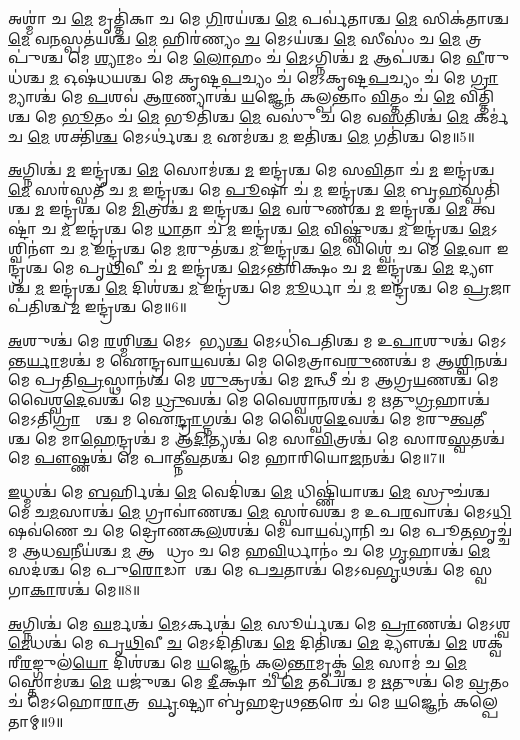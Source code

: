 𑌅𑌶𑍍𑌮𑌾॑ 𑌚 \ul{𑌮𑍇} 𑌮𑍃𑌤𑍍𑌤𑌿॑𑌕𑌾 𑌚 𑌮𑍇 \ul{𑌗𑌿}𑌰𑌯॑𑌶𑍍𑌚 \ul{𑌮𑍇} 𑌪𑌰𑍍𑌵॑𑌤𑌾𑌶𑍍𑌚 \ul{𑌮𑍇} 𑌸𑌿𑌕॑𑌤𑌾𑌶𑍍𑌚 \ul{𑌮𑍇} 𑌵\ul{𑌨}𑌸𑍍𑌪𑌤॑𑌯𑌶𑍍𑌚 \ul{𑌮𑍇} 𑌹𑌿𑌰॑𑌣𑍍𑌯𑌂 \ul{𑌚} 𑌮𑍇𑌽𑌯॑𑌶𑍍𑌚 \ul{𑌮𑍇} 𑌸𑍀𑌸𑌂॑ 𑌚 \ul{𑌮𑍇} 𑌤𑍍𑌰𑌪𑍁॑𑌶𑍍𑌚 𑌮𑍇 \ul{𑌶𑍍𑌯𑌾}𑌮𑌂 𑌚॑ 𑌮𑍇 \ul{𑌲𑍋}𑌹𑌂 𑌚॑ \ul{𑌮𑍇}𑌽𑌗𑍍𑌨𑌿𑌶𑍍𑌚॑ \ul{𑌮} 𑌆𑌪॑𑌶𑍍𑌚 𑌮𑍇 \ul{𑌵𑍀}𑌰𑍁𑌧॑𑌶𑍍𑌚 \ul{𑌮} 𑌓𑌷॑𑌧𑌯𑌶𑍍𑌚 𑌮𑍇 𑌕𑍃𑌷𑍍𑌟\ul{𑌪}𑌚𑍍𑌯𑌂 𑌚॑ 𑌮𑍇𑌽𑌕𑍃𑌷𑍍𑌟\ul{𑌪}𑌚𑍍𑌯𑌂 𑌚॑ 𑌮𑍇 \ul{𑌗𑍍𑌰𑌾}𑌮𑍍𑌯𑌾𑌶𑍍𑌚॑ 𑌮𑍇 \ul{𑌪}𑌶𑌵॑ 𑌆\ul{𑌰}𑌣𑍍𑌯𑌾𑌶𑍍𑌚॑ \ul{𑌯}𑌜𑍍𑌞𑍇𑌨॑ 𑌕𑌲𑍍𑌪𑌨𑍍𑌤𑌾𑌂 \ul{𑌵𑌿}𑌤𑍍𑌤𑌂 𑌚॑ \ul{𑌮𑍇} 𑌵𑌿𑌤𑍍𑌤𑌿॑𑌶𑍍𑌚 𑌮𑍇 \ul{𑌭𑍂}𑌤𑌂 𑌚॑ \ul{𑌮𑍇} 𑌭𑍂𑌤𑌿॑𑌶𑍍𑌚 \ul{𑌮𑍇} 𑌵𑌸𑍁॑ 𑌚 𑌮𑍇 𑌵\ul{𑌸}𑌤𑌿𑌶𑍍𑌚॑ \ul{𑌮𑍇} 𑌕𑌰𑍍𑌮॑ 𑌚 \ul{𑌮𑍇} 𑌶𑌕𑍍𑌤𑌿॑\ul{𑌶𑍍𑌚} 𑌮𑍇𑌽𑌰𑍍𑌥॑𑌶𑍍𑌚 \ul{𑌮} 𑌏𑌮॑𑌶𑍍𑌚 \ul{𑌮} 𑌇𑌤𑌿॑𑌶𑍍𑌚 \ul{𑌮𑍇} 𑌗𑌤𑌿॑𑌶𑍍𑌚 𑌮𑍇॥5॥ 

\ul{𑌅}𑌗𑍍𑌨𑌿𑌶𑍍𑌚॑ \ul{𑌮} 𑌇𑌨𑍍𑌦𑍍𑌰॑𑌶𑍍𑌚 \ul{𑌮𑍇} 𑌸𑍋𑌮॑𑌶𑍍𑌚 \ul{𑌮} 𑌇𑌨𑍍𑌦𑍍𑌰॑𑌶𑍍𑌚 𑌮𑍇 𑌸\ul{𑌵𑌿}𑌤𑌾 𑌚॑ \ul{𑌮} 𑌇𑌨𑍍𑌦𑍍𑌰॑𑌶𑍍𑌚 \ul{𑌮𑍇} 𑌸𑌰॑𑌸𑍍𑌵𑌤𑍀 𑌚 \ul{𑌮} 𑌇𑌨𑍍𑌦𑍍𑌰॑𑌶𑍍𑌚 𑌮𑍇 \ul{𑌪𑍂}𑌷𑌾 𑌚॑ \ul{𑌮} 𑌇𑌨𑍍𑌦𑍍𑌰॑𑌶𑍍𑌚 \ul{𑌮𑍇} 𑌬𑍃\ul{𑌹}𑌸𑍍𑌪𑌤𑌿॑𑌶𑍍𑌚 \ul{𑌮} 𑌇𑌨𑍍𑌦𑍍𑌰॑𑌶𑍍𑌚 𑌮𑍇 \ul{𑌮𑌿}𑌤𑍍𑌰𑌶𑍍𑌚॑ \ul{𑌮} 𑌇𑌨𑍍𑌦𑍍𑌰॑𑌶𑍍𑌚 \ul{𑌮𑍇} 𑌵𑌰𑍁॑𑌣𑌶𑍍𑌚 \ul{𑌮} 𑌇𑌨𑍍𑌦𑍍𑌰॑𑌶𑍍𑌚 \ul{𑌮𑍇} 𑌤𑍍𑌵𑌷𑍍𑌟𑌾॑ 𑌚 \ul{𑌮} 𑌇𑌨𑍍𑌦𑍍𑌰॑𑌶𑍍𑌚 𑌮𑍇 \ul{𑌧𑌾}𑌤𑌾 𑌚॑ \ul{𑌮} 𑌇𑌨𑍍𑌦𑍍𑌰॑𑌶𑍍𑌚 \ul{𑌮𑍇} 𑌵𑌿𑌷𑍍𑌣𑍁॑𑌶𑍍𑌚 \ul{𑌮} 𑌇𑌨𑍍𑌦𑍍𑌰॑𑌶𑍍𑌚 \ul{𑌮𑍇}𑌽𑌶𑍍𑌵𑌿𑌨𑍗॑ 𑌚 \ul{𑌮} 𑌇𑌨𑍍𑌦𑍍𑌰॑𑌶𑍍𑌚 𑌮𑍇 \ul{𑌮}𑌰𑍁𑌤॑𑌶𑍍𑌚 \ul{𑌮} 𑌇𑌨𑍍𑌦𑍍𑌰॑𑌶𑍍𑌚 \ul{𑌮𑍇} 𑌵𑌿𑌶𑍍𑌵𑍇॑ 𑌚 𑌮𑍇 \ul{𑌦𑍇}𑌵𑌾 𑌇𑌨𑍍𑌦𑍍𑌰॑𑌶𑍍𑌚 𑌮𑍇 𑌪𑍃\ul{𑌥𑌿}𑌵𑍀 𑌚॑ \ul{𑌮} 𑌇𑌨𑍍𑌦𑍍𑌰॑𑌶𑍍𑌚 \ul{𑌮𑍇}𑌽𑌨𑍍𑌤𑌰𑌿॑𑌕𑍍𑌷𑌂 𑌚 \ul{𑌮} 𑌇𑌨𑍍𑌦𑍍𑌰॑𑌶𑍍𑌚 \ul{𑌮𑍇} 𑌦𑍍𑌯𑍗𑌶𑍍𑌚॑ \ul{𑌮} 𑌇𑌨𑍍𑌦𑍍𑌰॑𑌶𑍍𑌚 \ul{𑌮𑍇} 𑌦𑌿𑌶॑𑌶𑍍𑌚 \ul{𑌮} 𑌇𑌨𑍍𑌦𑍍𑌰॑𑌶𑍍𑌚 𑌮𑍇 \ul{𑌮𑍂}𑌰𑍍𑌧𑌾 𑌚॑ \ul{𑌮} 𑌇𑌨𑍍𑌦𑍍𑌰॑𑌶𑍍𑌚 𑌮𑍇 \ul{𑌪𑍍𑌰}𑌜𑌾𑌪॑𑌤𑌿𑌶𑍍𑌚 \ul{𑌮} 𑌇𑌨𑍍𑌦𑍍𑌰॑𑌶𑍍𑌚 𑌮𑍇॥6॥ 

\ul{𑌅}\ul{}𑌶𑍁𑌶𑍍𑌚॑ 𑌮𑍇 \ul{𑌰}𑌶𑍍𑌮𑌿\ul{𑌶𑍍𑌚} 𑌮𑍇𑌽𑌦𑌾᳚𑌭𑍍𑌯\ul{𑌶𑍍𑌚} 𑌮𑍇𑌽𑌧𑌿॑𑌪𑌤𑌿𑌶𑍍𑌚 𑌮 𑌉\ul{𑌪𑌾}\ul{}𑌶𑍁𑌶𑍍𑌚॑ 𑌮𑍇𑌽𑌨𑍍𑌤\ul{𑌰𑍍𑌯𑌾}𑌮𑌶𑍍𑌚॑ 𑌮 𑌐𑌨𑍍𑌦𑍍𑌰𑌵𑌾\ul{𑌯}𑌵𑌶𑍍𑌚॑ 𑌮𑍇 𑌮𑍈𑌤𑍍𑌰𑌾𑌵\ul{𑌰𑍁}𑌣𑌶𑍍𑌚॑ 𑌮 𑌆\ul{𑌶𑍍𑌵𑌿}𑌨𑌶𑍍𑌚॑ 𑌮𑍇 𑌪𑍍𑌰𑌤𑌿\ul{𑌪𑍍𑌰}𑌸𑍍𑌥𑌾𑌨॑𑌶𑍍𑌚 𑌮𑍇 \ul{𑌶𑍁}𑌕𑍍𑌰𑌶𑍍𑌚॑ 𑌮𑍇 \ul{𑌮}𑌨𑍍𑌥𑍀 𑌚॑ 𑌮 𑌆𑌗𑍍𑌰\ul{𑌯}𑌣𑌶𑍍𑌚॑ 𑌮𑍇 𑌵𑍈𑌶𑍍𑌵\ul{𑌦𑍇}𑌵𑌶𑍍𑌚॑ 𑌮𑍇 \ul{𑌧𑍍𑌰𑍁}𑌵𑌶𑍍𑌚॑ 𑌮𑍇 𑌵𑍈𑌶𑍍𑌵𑌾\ul{𑌨}𑌰𑌶𑍍𑌚॑ 𑌮 𑌋𑌤𑍁\ul{𑌗𑍍𑌰}𑌹𑌾𑌶𑍍𑌚॑ 𑌮𑍇𑌽𑌤𑌿\ul{𑌗𑍍𑌰𑌾}𑌹𑍍𑌯𑌾᳚𑌶𑍍𑌚 𑌮 𑌐\ul{𑌨𑍍𑌦𑍍𑌰𑌾}𑌗𑍍𑌨𑌶𑍍𑌚॑ 𑌮𑍇 𑌵𑍈𑌶𑍍𑌵\ul{𑌦𑍇}𑌵𑌶𑍍𑌚॑ 𑌮𑍇 𑌮𑌰𑍁\ul{𑌤𑍍𑌵}𑌤𑍀𑌯𑌾᳚𑌶𑍍𑌚 𑌮𑍇 𑌮𑌾\ul{𑌹𑍇}𑌨𑍍𑌦𑍍𑌰𑌶𑍍𑌚॑ 𑌮 𑌆\ul{𑌦𑌿}𑌤𑍍𑌯𑌶𑍍𑌚॑ 𑌮𑍇 𑌸𑌾\ul{𑌵𑌿}𑌤𑍍𑌰𑌶𑍍𑌚॑ 𑌮𑍇 𑌸𑌾𑌰\ul{𑌸𑍍𑌵}𑌤𑌶𑍍𑌚॑ 𑌮𑍇 \ul{𑌪𑍗}𑌷𑍍𑌣𑌶𑍍𑌚॑ 𑌮𑍇 𑌪𑌾𑌤𑍍𑌨𑍀\ul{𑌵}𑌤𑌶𑍍𑌚॑ 𑌮𑍇 𑌹𑌾𑌰𑌿𑌯𑍋\ul{𑌜}𑌨𑌶𑍍𑌚॑ 𑌮𑍇॥7॥ 

\ul{𑌇}𑌧𑍍𑌮𑌶𑍍𑌚॑ 𑌮𑍇 \ul{𑌬}𑌰𑍍𑌹𑌿𑌶𑍍𑌚॑ \ul{𑌮𑍇} 𑌵𑍇𑌦𑌿॑𑌶𑍍𑌚 \ul{𑌮𑍇} 𑌧𑌿𑌷𑍍𑌣𑌿॑𑌯𑌾𑌶𑍍𑌚 \ul{𑌮𑍇} 𑌸𑍍𑌰𑍁𑌚॑𑌶𑍍𑌚 𑌮𑍇 𑌚\ul{𑌮}𑌸𑌾𑌶𑍍𑌚॑ \ul{𑌮𑍇} 𑌗𑍍𑌰𑌾𑌵𑌾॑𑌣𑌶𑍍𑌚 \ul{𑌮𑍇} 𑌸𑍍𑌵𑌰॑𑌵𑌶𑍍𑌚 𑌮 𑌉𑌪\ul{𑌰}𑌵𑌾𑌶𑍍𑌚॑ 𑌮𑍇𑌽\ul{𑌧𑌿}𑌷𑌵॑𑌣𑍇 𑌚 𑌮𑍇 𑌦𑍍𑌰𑍋𑌣𑌕\ul{𑌲}𑌶𑌶𑍍𑌚॑ 𑌮𑍇 𑌵𑌾\ul{𑌯}𑌵𑍍𑌯𑌾॑𑌨𑌿 𑌚 𑌮𑍇 𑌪𑍂\ul{𑌤}𑌭𑍃𑌚𑍍𑌚॑ 𑌮 𑌆𑌧\ul{𑌵}𑌨𑍀𑌯॑𑌶𑍍𑌚 \ul{𑌮} 𑌆𑌗𑍍𑌨𑍀᳚𑌧𑍍𑌰𑌂 𑌚 𑌮𑍇 𑌹\ul{𑌵𑌿}𑌰𑍍𑌧𑌾𑌨𑌂॑ 𑌚 𑌮𑍇 \ul{𑌗𑍃}𑌹𑌾𑌶𑍍𑌚॑ \ul{𑌮𑍇} 𑌸𑌦॑𑌶𑍍𑌚 𑌮𑍇 𑌪𑍁\ul{𑌰𑍋}𑌡𑌾𑌶𑌾᳚𑌶𑍍𑌚 𑌮𑍇 𑌪\ul{𑌚}𑌤𑌾𑌶𑍍𑌚॑ 𑌮𑍇𑌽𑌵\ul{𑌭𑍃}𑌥𑌶𑍍𑌚॑ 𑌮𑍇 𑌸𑍍𑌵𑌗𑌾\ul{𑌕𑌾}𑌰𑌶𑍍𑌚॑ 𑌮𑍇॥8॥ 

\ul{𑌅}𑌗𑍍𑌨𑌿𑌶𑍍𑌚॑ 𑌮𑍇 \ul{𑌘}𑌰𑍍𑌮𑌶𑍍𑌚॑ \ul{𑌮𑍇}𑌽𑌰𑍍𑌕𑌶𑍍𑌚॑ \ul{𑌮𑍇} 𑌸𑍂𑌰𑍍𑌯॑𑌶𑍍𑌚 𑌮𑍇 \ul{𑌪𑍍𑌰𑌾}𑌣𑌶𑍍𑌚॑ 𑌮𑍇𑌽𑌶𑍍𑌵\ul{𑌮𑍇}𑌧𑌶𑍍𑌚॑ 𑌮𑍇 𑌪𑍃\ul{𑌥𑌿}𑌵𑍀 \ul{𑌚} 𑌮𑍇𑌽𑌦𑌿॑𑌤𑌿𑌶𑍍𑌚 \ul{𑌮𑍇} 𑌦𑌿𑌤𑌿॑𑌶𑍍𑌚 \ul{𑌮𑍇} 𑌦𑍍𑌯𑍗𑌶𑍍𑌚॑ \ul{𑌮𑍇} 𑌶𑌕𑍍𑌵॑𑌰𑍀\ul{𑌰}𑌙𑍍𑌗𑍁𑌲॑\ul{𑌯𑍋} 𑌦𑌿𑌶॑𑌶𑍍𑌚 𑌮𑍇 \ul{𑌯}𑌜𑍍𑌞𑍇𑌨॑ 𑌕𑌲𑍍𑌪\ul{𑌨𑍍𑌤𑌾}𑌮𑍃𑌕𑍍𑌚॑ \ul{𑌮𑍇} 𑌸𑌾𑌮॑ 𑌚 \ul{𑌮𑍇} 𑌸𑍍𑌤𑍋𑌮॑𑌶𑍍𑌚 \ul{𑌮𑍇} 𑌯𑌜𑍁॑𑌶𑍍𑌚 𑌮𑍇 \ul{𑌦𑍀}𑌕𑍍𑌷𑌾 𑌚॑ \ul{𑌮𑍇} 𑌤𑌪॑𑌶𑍍𑌚 𑌮 \ul{𑌋}𑌤𑍁𑌶𑍍𑌚॑ 𑌮𑍇 \ul{𑌵𑍍𑌰}𑌤𑌂 𑌚॑ 𑌮𑍇𑌽𑌹𑍋\ul{𑌰𑌾}𑌤𑍍𑌰𑌯𑍋᳚\ul{𑌰𑍍𑌵𑍃}𑌷𑍍𑌟𑍍𑌯𑌾 𑌬𑍃॑𑌹𑌦𑍍𑌰𑌥\ul{𑌨𑍍𑌤}𑌰𑍇 𑌚॑ 𑌮𑍇 \ul{𑌯}𑌜𑍍𑌞𑍇𑌨॑ 𑌕𑌲𑍍𑌪𑍇𑌤𑌾𑌮𑍍॥9॥ 

